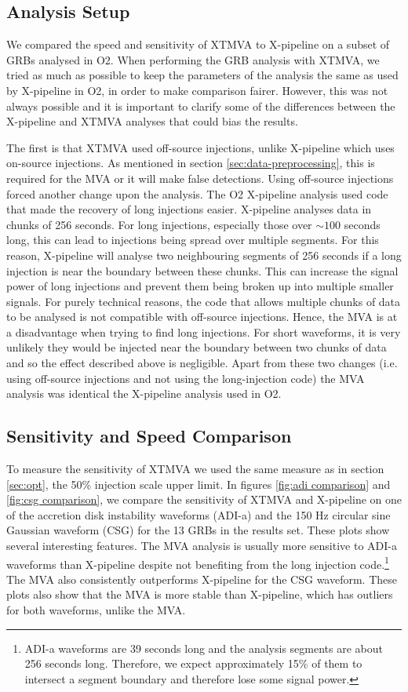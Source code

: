 \documentclass[11pt]{cuthesis}
\newcommand{\xp}{X-pipeline }
\newcommand{\xpc}{X-pipeline, }
\begin{document}
\subsection{Analysis Setup}
We compared the speed and sensitivity of XTMVA to \xp on a subset of GRBs analysed in O2. When performing the GRB analysis with XTMVA, we tried as much as possible to keep the parameters of the analysis the same as used by \xp in O2, in order to make comparison fairer. However, this was not always possible and it is important to clarify some of the differences between the \xp and XTMVA analyses that could bias the results. 

The first is that XTMVA used off-source injections, unlike \xp which uses on-source injections. As mentioned in section \ref{sec:data-preprocessing}, this is required for the MVA or it will make false detections. Using off-source injections forced another change upon the analysis. The O2 \xp analysis used code that made the recovery of long injections easier. \xp analyses data in chunks of 256 seconds. For long injections, especially those over $\sim100$ seconds long, this can lead to injections being spread over multiple segments. For this reason, \xp will analyse two neighbouring segments of 256 seconds if a long injection is near the boundary between these chunks. This can increase the signal power of long injections and prevent them being broken up into multiple smaller signals. For purely technical reasons, the code that allows multiple chunks of data to be analysed is not compatible with off-source injections. Hence, the MVA is at a disadvantage when trying to find long injections. For short waveforms, it is very unlikely they would be injected near the boundary between two chunks of data and so the effect described above is negligible. Apart from these two changes (i.e. using off-source injections and not using the long-injection code) the MVA analysis was identical the \xp analysis used in O2. 

\subsection{Sensitivity and Speed Comparison}
To measure the sensitivity of XTMVA we used the same measure as in section \ref{sec:opt}, the 50\% injection scale upper limit. In figures \ref{fig:adi comparison} and \ref{fig:csg comparison}, we compare the sensitivity of XTMVA and \xp on one of the accretion disk instability waveforms (ADI-a) and the 150 Hz circular sine Gaussian waveform (CSG) for the 13 GRBs in the results set. These plots show several interesting features. The MVA analysis is usually more sensitive to ADI-a waveforms than \xp despite not benefiting from the long injection code.\footnote{ADI-a waveforms are 39 seconds long and the analysis segments are about 256 seconds long. Therefore, we expect approximately 15\% of them to intersect a segment boundary and therefore lose some signal power.} The MVA also consistently outperforms \xp for the CSG waveform. These plots also show that the MVA is more stable than \xpc which has outliers for both waveforms, unlike the MVA.
\end{document}
